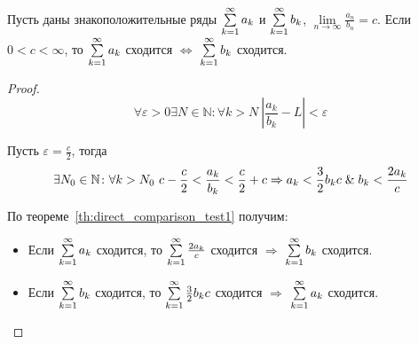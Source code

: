 \begin{theorem}[сравнения]
Пусть даны знакоположительные ряды $\sum\limits_{k=1}^\infty a_k$ и $\sum\limits_{k=1}^\infty b_k$, $\lim\limits_{n \to \infty} \frac{a_n}{b_n} = c$.
Если $0 < c < \infty$, то $\sum\limits_{k=1}^\infty a_k$ сходится $\Leftrightarrow$ $\sum\limits_{k=1}^\infty b_k$ сходится.
\end{theorem}
\begin{proof}
\begin{equation*}
\forall \varepsilon > 0 \exists N \in \mathbb N \colon \forall k > N \ \left| \frac{a_k}{b_k} - L \right| < \varepsilon
\end{equation*}

Пусть $\varepsilon = \frac{c}2$, тогда
\begin{equation*}
\exists N_0 \in \mathbb N \colon \forall k > N_0 \ c - \frac{c}2 < \frac{a_k}{b_k} < \frac{c}2 + c \Rightarrow
a_k < \frac32 b_k c \mathrel{\&} b_k < \frac{2 a_k}c
\end{equation*}

По теореме~\ref*{th:direct_comparison_test1} получим:
\begin{itemize}
	\item Если $\sum\limits_{k=1}^\infty a_k$ сходится, то $\sum\limits_{k=1}^\infty \frac{2 a_k}c$ сходится $\Rightarrow$ $\sum\limits_{k=1}^\infty b_k$ сходится.
	\item Если $\sum\limits_{k=1}^\infty b_k$ сходится, то $\sum\limits_{k=1}^\infty \frac32 b_k c$ сходится $\Rightarrow$ $\sum\limits_{k=1}^\infty a_k$ сходится.
\end{itemize}
\end{proof}

